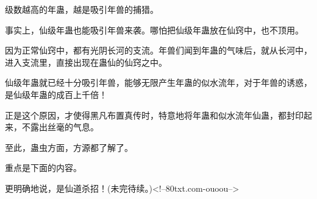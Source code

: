 \begin{this_body}
级数越高的年蛊，越是吸引年兽的捕猎。

事实上，仙级年蛊也能吸引年兽来袭。哪怕把仙级年蛊放在仙窍中，也不顶用。

因为正常仙窍中，都有光阴长河的支流。年兽们闻到年蛊的气味后，就从长河中，进入支流里，直接出现在蛊仙的仙窍之中。

仙级年蛊就已经十分吸引年兽，能够无限产生年蛊的似水流年，对于年兽的诱惑，是仙级年蛊的成百上千倍！

正是这个原因，才使得黑凡布置真传时，特意地将年蛊和似水流年仙蛊，都封印起来，不露出丝毫的气息。

至此，蛊虫方面，方源都了解了。

重点是下面的内容。

更明确地说，是仙道杀招！(未完待续。)<!--80txt.com-ouoou-->

\end{this_body}

